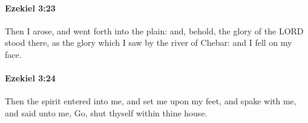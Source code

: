 		\paragraph{Ezekiel 3:23} %
			\label{EZEKIEL-3-23}

			Then I arose, and went forth into the plain: and, behold, the glory of the LORD stood there, as the glory which I saw by the river of Chebar: and I fell on my face.


		\paragraph{Ezekiel 3:24} %
			\label{EZEKIEL-3-24}

			Then the spirit entered into me, and set me upon my feet, and spake with me, and said unto me, Go, shut thyself within thine house.


